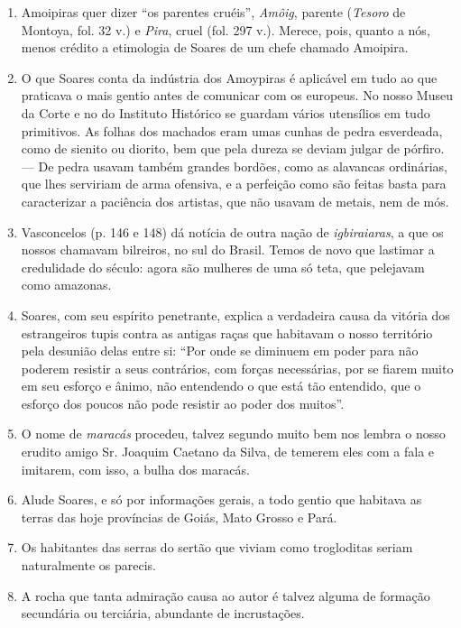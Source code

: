\begin{enumerate}
\item Amoipiras quer dizer ``os parentes cruéis'', \textit{Amôig}, parente (\textit{Tesoro} de 
Montoya, fol. 32 v.) e \textit{Pira}, cruel (fol. 297 v.). Merece, pois, quanto a nós, menos 
crédito a etimologia de Soares de um chefe chamado Amoipira.

\item O que Soares conta da indústria dos Amoypiras é aplicável em tudo ao que praticava 
o mais gentio antes de comunicar com os europeus.
No nosso Museu da Corte e no do Instituto Histórico se guardam vários utensílios em 
tudo primitivos. As folhas dos machados eram umas cunhas de pedra esverdeada, como de 
sienito ou diorito, bem que pela dureza se deviam julgar de pórfiro. --- De pedra usavam 
também grandes bordões, como as alavancas ordinárias, que lhes serviriam de arma 
ofensiva, e a perfeição como são feitas basta para caracterizar a paciência dos artistas, que 
não usavam de metais, nem de mós.

\item  Vasconcelos (p. 146 e 148) dá notícia de outra nação de \textit{igbiraiaras},
a que os nossos chamavam bilreiros, no sul do Brasil.
Temos de novo que lastimar a credulidade do século: agora são mulheres de uma só 
teta, que pelejavam como amazonas.

\item Soares, com seu espírito penetrante, explica a verdadeira causa da vitória dos 
estrangeiros tupis contra as antigas raças que habitavam o nosso território pela desunião 
delas entre si: ``Por onde se diminuem em poder para não poderem resistir a seus 
contrários, com forças necessárias, por se fiarem muito em seu esforço e ânimo, não 
entendendo o que está tão entendido, que o esforço dos poucos não pode resistir ao 
poder dos muitos''. 

\item O nome de \textit{maracás} procedeu, talvez segundo muito bem nos lembra o nosso 
erudito amigo Sr. Joaquim Caetano da Silva, de temerem eles com a fala e imitarem, 
com isso, a bulha dos maracás.

\item Alude Soares, e só por informações gerais, a todo gentio que habitava  as terras 
das hoje províncias de Goiás, Mato Grosso e Pará.

\item Os habitantes das serras do sertão que viviam como trogloditas seriam 
naturalmente os parecis.

\item A rocha que tanta admiração causa ao autor é talvez alguma de formação 
secundária ou terciária, abundante de incrustações.


\end{enumerate}
